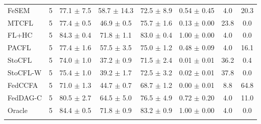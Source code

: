 {\begin{tabular}{l r c c c c c c}
FeSEM & 5 & 77.1 $\pm$ 7.5 & 58.7 $\pm$ 14.3 & 72.5 $\pm$ 8.9 & 0.54 $\pm$ 0.45 & 4.0 & 20.3 \\
MTCFL & 5 & 77.4 $\pm$ 0.5 & 46.9 $\pm$ 0.5 & 75.7 $\pm$ 1.6 & 0.13 $\pm$ 0.00 & 23.8 & 0.0 \\
FL+HC & 5 & 84.3 $\pm$ 0.4 & 71.8 $\pm$ 1.1 & 83.0 $\pm$ 0.4 & 1.00 $\pm$ 0.00 & 4.0 & 0.0 \\
PACFL & 5 & 77.4 $\pm$ 1.6 & 57.5 $\pm$ 3.5 & 75.0 $\pm$ 1.2 & 0.48 $\pm$ 0.09 & 4.0 & 16.1 \\
StoCFL & 5 & 74.0 $\pm$ 1.0 & 37.2 $\pm$ 0.9 & 71.5 $\pm$ 2.4 & 0.01 $\pm$ 0.01 & 36.2 & 0.4 \\
StoCFL-W & 5 & 75.4 $\pm$ 1.0 & 39.2 $\pm$ 1.7 & 72.5 $\pm$ 3.2 & 0.02 $\pm$ 0.01 & 37.8 & 0.0 \\
FedCCFA & 5 & 71.0 $\pm$ 1.3 & 44.7 $\pm$ 0.7 & 68.7 $\pm$ 1.2 & 0.00 $\pm$ 0.01 & 8.8 & 64.8 \\
FedDAG-C & 5 & 80.5 $\pm$ 2.7 & 64.5 $\pm$ 5.0 & 76.5 $\pm$ 4.9 & 0.72 $\pm$ 0.20 & 4.0 & 11.0 \\
Oracle & 5 & 84.4 $\pm$ 0.5 & 71.8 $\pm$ 0.9 & 83.2 $\pm$ 0.9 & 1.00 $\pm$ 0.00 & 4.0 & 0.0 \\
\addlinespace
\bottomrule
\end{tabular}
}

